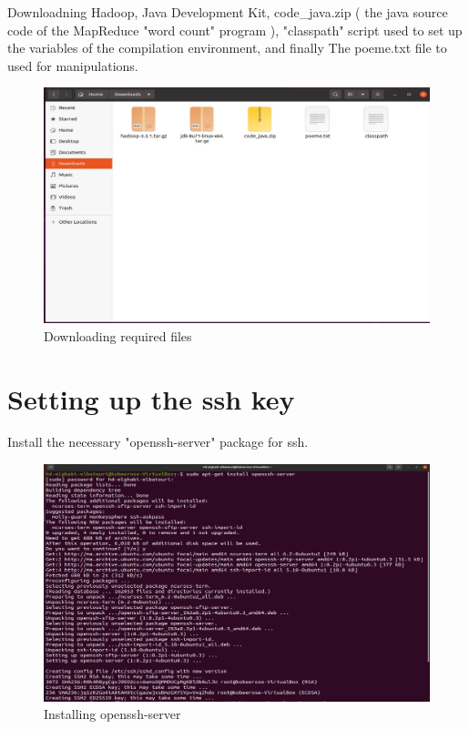 \begin{spacing}{1.2}
\par Downloadning Hadoop, Java Development Kit, code_java.zip ( the java source code of the MapReduce "word count" program ), "classpath" script used to set up the variables of the compilation environment, and finally The poeme.txt file to used for manipulations.
\\
\begin{figure}[!htb] 
\begin{center} 
\includegraphics[width=1\linewidth]{Big_Data/Hadoop/Apache Hadoop Installation/Downloading required files} 
\end{center} 
\caption{Downloading required files} 
\end{figure} 
\FloatBarrier

\section{Setting up the ssh key }

\par Install the necessary "openssh-server" package for ssh.
\\
\begin{figure}[!htb] 
\begin{center} 
\includegraphics[width=1\linewidth]{Big_Data/Hadoop/Apache Hadoop Installation/Installing openssh-server} 
\end{center} 
\caption{Installing openssh-server} 
\end{figure} 
\FloatBarrier




\end{spacing}
